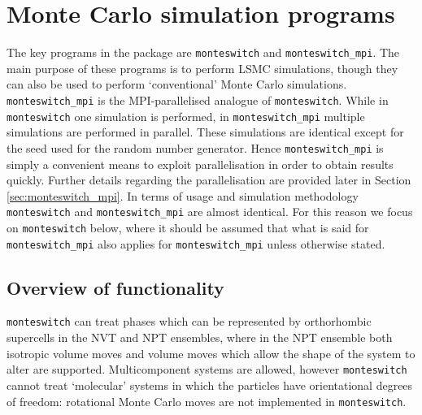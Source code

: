 \documentclass{report}
\begin{document}
\chapter{Monte Carlo simulation programs}\label{chapter:simulation_programs}
The key programs in the package are \texttt{monteswitch} and \texttt{monteswitch\_mpi}.
The main purpose of these programs is to perform LSMC simulations, though they can also
be used to perform `conventional' Monte Carlo simulations. \texttt{monteswitch\_mpi} is the MPI-parallelised analogue of \texttt{monteswitch}. 
While in \texttt{monteswitch} one simulation is performed, in \texttt{monteswitch\_mpi} multiple simulations are 
performed in parallel. These simulations are identical except for the seed used for the random number generator. Hence \texttt{monteswitch\_mpi}
is simply a convenient means to exploit parallelisation in order to obtain results quickly. Further details regarding the parallelisation
are provided later in Section \ref{sec:monteswitch_mpi}.
%
In terms of usage and simulation methodology \texttt{monteswitch} and \texttt{monteswitch\_mpi} are almost identical. For this reason we 
focus on \texttt{monteswitch} below, where it should be assumed that what is said for \texttt{monteswitch\_mpi} also applies for
\texttt{monteswitch\_mpi} unless otherwise stated.

\section{Overview of functionality}
\texttt{monteswitch} can treat phases which can be represented by orthorhombic supercells in the NVT and NPT ensembles, where in the
NPT ensemble both isotropic volume moves and volume moves which allow the shape of the system to alter are supported. Multicomponent
systems are allowed, however \texttt{monteswitch} cannot treat `molecular' systems in which the particles have orientational degrees of
freedom: rotational Monte Carlo moves are not implemented in \texttt{monteswitch}.
\end{document}
